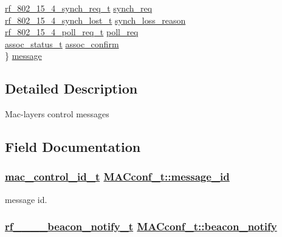 \begin{CompactItemize}
\begin{tabbing}
\>\hyperlink{structrf__802__15__4__synch__req__t}{rf\_802\_15\_4\_synch\_req\_t} \hyperlink{structMACconf__t_52c0778c38fbd508c85c73b6843c34df}{synch\_req}\\
\>\hyperlink{structrf__802__15__4__synch__lost__t}{rf\_802\_15\_4\_synch\_lost\_t} \hyperlink{structMACconf__t_1e2659ba9ca3c9393ed0b6b4b4b095ec}{synch\_loss\_reason}\\
\>\hyperlink{structrf__802__15__4__poll__req__t}{rf\_802\_15\_4\_poll\_req\_t} \hyperlink{structMACconf__t_33c70a1389613a28534827454b214c78}{poll\_req}\\
\>\hyperlink{rf__802__15__4_8h_8dd8e855fea9627a62ab967a7b3b47af}{assoc\_status\_t} \hyperlink{structMACconf__t_1a8fef873257b76abe7e7058001a6ea9}{assoc\_confirm}\\
\} \hyperlink{structMACconf__t_6f1770beed1fc26677997b27799bb364}{message}\\

\end{tabbing}\end{CompactItemize}


\subsection{Detailed Description}
Mac-layers control messages 



\subsection{Field Documentation}
\hypertarget{structMACconf__t_7d4dad417562c658e705accd2bf0ddd6}{
\subsubsection[message\_\-id]{\setlength{\rightskip}{0pt plus 5cm}\hyperlink{rf__802__15__4_8h_01e0aae058da837b0908ec100a76e3d3}{mac\_\-control\_\-id\_\-t} \hyperlink{structMACconf__t_7d4dad417562c658e705accd2bf0ddd6}{MACconf\_\-t::message\_\-id}}}
\label{structMACconf__t_7d4dad417562c658e705accd2bf0ddd6}


message id. \hypertarget{structMACconf__t_798614411040fccfac2f811d38f9efb4}{
\subsubsection[beacon\_\-notify]{\setlength{\rightskip}{0pt plus 5cm}\hyperlink{structrf__802__15__4__beacon__notify__t}{rf\_\_\_\_\-beacon\_\-notify\_\-t} \hyperlink{structMACconf__t_798614411040fccfac2f811d38f9efb4}{MACconf\_\-t::beacon\_\-notify}}}
\label{structMACconf__t_798614411040fccfac2f811d38f9efb4}


